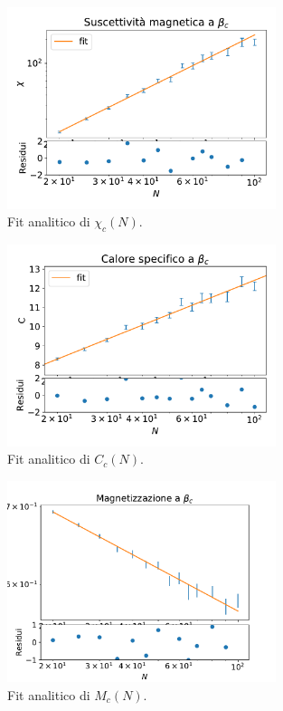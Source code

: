 \documentclass[a4paper,11pt]{article}
\begin{document}
	\begin{figure}[h!]
        \centering
        \includegraphics[width=0.7\textwidth]{figure/chi_fs_fit.pdf}
        \caption{Fit analitico di $\chi_c(N)$.}
        \label{fig:chi_fs_fit}
	\end{figure}

	\begin{figure}[h]
        \centering
        \includegraphics[width=0.7\textwidth]{figure/C_fs_fit.pdf}
        \caption{Fit analitico di $C_c(N)$.}
        \label{fig:C_fs_fit}
	\end{figure}
	
	
	\begin{figure}[h]
        \centering
        \includegraphics[width=0.7\textwidth]{figure/m_fs_fit.pdf}
        \caption{Fit analitico di $M_c(N)$.}
        \label{fig:M_fs_fit}
	\end{figure}
	
	
	
	
\end{document}
